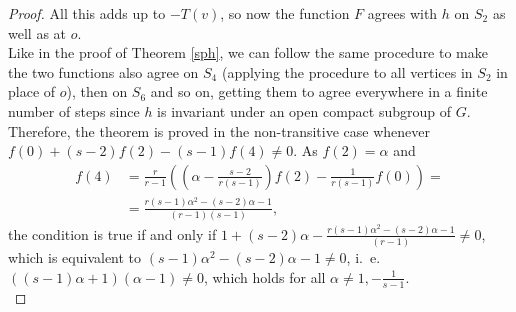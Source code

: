 \documentclass[10pt,a4paper]{amsart}
\begin{document}
\begin{proof}
All this adds up to $-T(v)$, so now the function $F$ agrees with $h$ on $S_2$ as well as at $o$. \\

Like in the proof of Theorem \ref{sph}, we can follow the same procedure to make the two functions also agree on $S_4$ (applying the procedure to all vertices in $S_2$ in place of $o$), then on $S_6$ and so on, getting them to agree everywhere in a finite number of steps since $h$ is invariant under an open compact subgroup of $G$. \\

Therefore, the theorem is proved in the non-transitive case whenever $f(0)+(s-2)f(2)-(s-1)f(4)\neq 0$. As $f(2)=\alpha$ and
\begin{align*}
f(4)&=\frac{r}
{r-1}\left(\left(\alpha-\frac{s-2}{r(s-1)}\right)f(2)-\frac{1}{r(s-1)}f(0)\right)= \\
&=\frac{r(s-1)\alpha^2-(s-2)\alpha-1}{(r-1)(s-1)},
\end{align*}
the condition is true if and only if $1+(s-2)\alpha-\frac{r(s-1)\alpha^2-(s-2)\alpha-1}{(r-1)}\neq 0$, which is equivalent to $(s-1)\alpha^2-(s-2)\alpha-1\neq 0$, i.~e.~$((s-1)\alpha+1)(\alpha-1)\neq 0$, which holds for all $\alpha\neq 1,-\frac{1}{s-1}$. \\
\end{proof}
\end{document}
